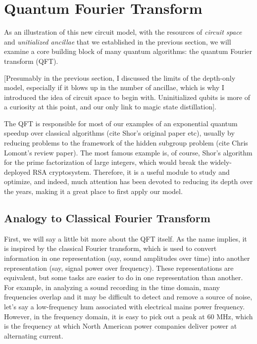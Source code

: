 \section{Quantum Fourier Transform}

As an illustration of this new circuit model, with the resources of
\emph{circuit space} and \emph{unitialized ancillae} that we established in
the previous section, we will examine a core building block of many
quantum algorithms: the quantum Fourier transform (QFT).

[Presumably in the previous section, I discussed the limits of the depth-only
model, especially if it blows up in the number of ancillae, which is why I
introduced the idea of circuit space to begin with. Uninitialized qubits is
more of a curiosity at this point, and our only link to magic state distillation].

The QFT is responsible for most of our examples of an exponential quantum
speedup over classical algorithms (cite Shor's original paper etc), usually
by reducing problems to the framework of the hidden subgroup problem
(cite Chris Lomont's review paper). The most famous example is, of course,
Shor's algorithm for the prime factorization of large integers, which would
break the widely-deployed RSA cryptosystem. Therefore, it is a useful
module to study and optimize, and indeed, much attention has been devoted
to reducing its depth over the years, making it a great place to first apply
our model.

\subsection{Analogy to Classical Fourier Transform}

First, we will say a little bit more about the QFT itself. As the name implies,
it is inspired by the classical Fourier transform, which is used to convert
information in one representation (say, sound amplitudes over time) into another
representation (say, signal power over frequency). These representations are
equivalent, but some tasks are easier to do in one representation than another.
For example, in analyzing a sound recording in the time domain, many frequencies overlap and it
may be difficult to detect and remove a source of noise, let's say a low-frequency
hum associated with electrical mains power frequency. However, in the frequency
domain, it is easy to pick out a peak at 60 MHz, which is the frequency at
which North American power companies deliver power at alternating current.

